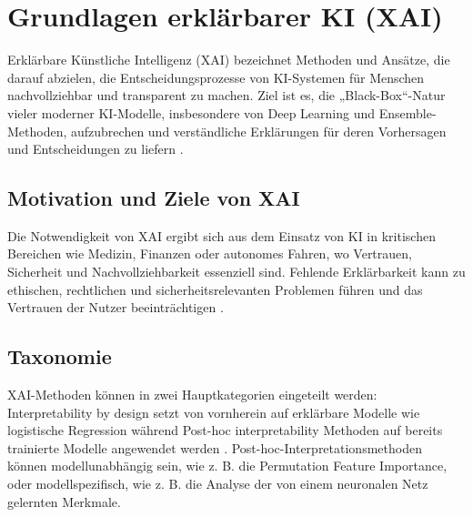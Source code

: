 \section{Grundlagen erklärbarer KI (XAI)}
    Erklärbare Künstliche Intelligenz (XAI) bezeichnet Methoden und Ansätze, die darauf abzielen, die Entscheidungsprozesse von KI-Systemen für Menschen nachvollziehbar und transparent zu machen. Ziel ist es, die „Black-Box“-Natur vieler moderner KI-Modelle, insbesondere von Deep Learning und Ensemble-Methoden, aufzubrechen und verständliche Erklärungen für deren Vorhersagen und Entscheidungen zu liefern \cite{Arrieta2019Explainable}.

    \subsection{Motivation und Ziele von XAI}
        Die Notwendigkeit von XAI ergibt sich aus dem Einsatz von KI in kritischen Bereichen wie Medizin, Finanzen oder autonomes Fahren, wo Vertrauen, Sicherheit und Nachvollziehbarkeit essenziell sind. Fehlende Erklärbarkeit kann zu ethischen, rechtlichen und sicherheitsrelevanten Problemen führen und das Vertrauen der Nutzer beeinträchtigen \cite{molnar2025}.

    \subsection{Taxonomie}
        XAI-Methoden können in zwei Hauptkategorien eingeteilt werden: Interpretability by design setzt von vornherein auf erklärbare Modelle wie logistische Regression während Post-hoc interpretability Methoden auf bereits trainierte Modelle angewendet werden \cite{molnar2025}. Post-hoc-Interpretationsmethoden können modellunabhängig sein, wie z. B. die Permutation Feature Importance, oder modellspezifisch, wie z. B. die Analyse der von einem neuronalen Netz gelernten Merkmale.

